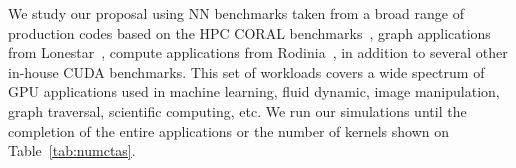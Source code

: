 We study our proposal using NN benchmarks taken from a broad range of production 
codes based on the HPC CORAL benchmarks~\cite{coral}, graph applications from 
Lonestar~\cite{lonestar}, compute applications from Rodinia~\cite{Che2009}, in 
addition to several other in-house CUDA benchmarks. This set of workloads covers 
a wide spectrum of GPU applications used in machine learning, fluid dynamic, 
image manipulation, graph traversal, scientific computing, etc. We run our 
simulations until the completion of the entire applications or the number of 
kernels shown on Table~\ref{tab:numctas}.



